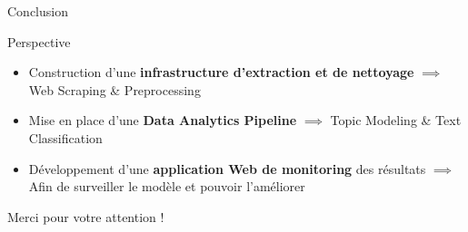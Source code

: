 \documentclass[10pt,sans,usenames,dvipsnames,english,compress]{beamer}
\begin{document}
\begin{frame}{Conclusion}
\begin{alertblock}{Perspective}
	\begin{itemize}
        \item Construction d'une \textbf{infrastructure d’extraction et de nettoyage} \newline
  $\implies$ Web Scraping \& Preprocessing
        \item Mise en place d'une \textbf{Data Analytics Pipeline} \newline
  $\implies$ Topic Modeling \& Text Classification
        \item Développement d'une \textbf{application Web de monitoring} des résultats \newline
  $\implies$ Afin de surveiller le modèle et pouvoir l'améliorer
	\end{itemize}
\end{alertblock}    
\end{frame}

\begin{frame}
    \centering
    \LARGE{Merci pour votre attention !}
\end{frame}
\end{document}
